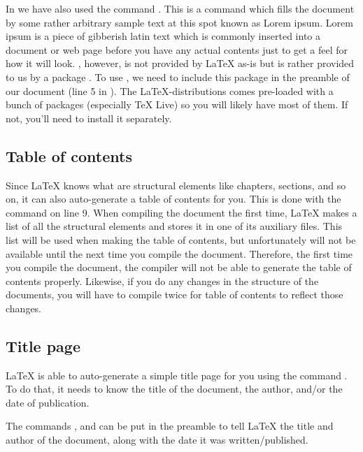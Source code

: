 In  we have also used the command \latexin{\lipsum}. This is a command which fills the document by some rather arbitrary sample text at this spot known as Lorem ipsum. Lorem ipsum is a piece of gibberish latin text which is commonly inserted into a document or web page before you have any actual contents just to get a feel for how it will look. \latexin{\lipsum}, however, is not provided by \LaTeX{} as-is but is rather provided to us by a package . To use \latexin{\lipsum}, we need to include this package in the preamble of our document (line 5 in ). The \LaTeX{}-distributions comes pre-loaded with a bunch of packages (especially TeX Live) so you will likely have most of them. If not, you'll need to install it separately.

\subsection{Table of contents}
Since \LaTeX{} knows what are structural elements like chapters, sections, and so on, it can also auto-generate a table of contents for you. This is done with the \latexin{\tableofcontents} command on line 9. When compiling the document the first time, \LaTeX{} makes a list of all the structural elements and stores it in one of its auxiliary files. This list will be used when making the table of contents, but unfortunately will not be available until the next time you compile the document. Therefore, the first time you compile the document, the compiler will not be able to generate the table of contents properly. Likewise, if you do any changes in the structure of the documents, you will have to compile twice for table of contents to reflect those changes.

\subsection{Title page}
\LaTeX{} is able to auto-generate a simple title page for you using the command \latexin{\maketitle}. To do that, it needs to know the title of the document, the author, and/or the date of publication.

The commands \latexin{\title}, \latexin{\author} and \latexin{\date} can be put in the preamble to tell \LaTeX{} the title and author of the document, along with the date it was written/published.

